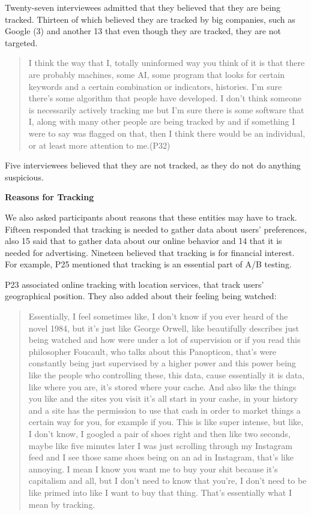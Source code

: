 Twenty-seven interviewees admitted that they believed that they are being
tracked. Thirteen of which believed they are tracked by big companies, such as
Google (3) and another 13 that even though they are tracked, they are not
targeted. 


\begin{quote}I think the way that I, totally uninformed way you think of it is
that there are probably machines, some AI, some program that looks for certain
keywords and a certain combination or indicators, histories. I'm sure there's
some algorithm that people have developed. I don't think someone is
necessarily actively tracking me but I'm sure there is some software that I,
along with many other people are being tracked by and if something I were to
say was flagged on that, then I think there would be an individual, or at
least more attention to me.(P32)\end{quote}


Five interviewees believed that they are not tracked, as they do not do
anything suspicious.


\textbf{Reasons for Tracking}    

We also asked participants about reasons that these entities may have to
track. Fifteen responded that tracking is needed to gather data about users'
preferences, also 15 said that to gather data about our online behavior and 14
that it is needed for advertising. Nineteen believed that tracking is for
financial interest. For example, P25 mentioned that tracking is an essential
part of A/B testing. 

P23 associated online tracking with location services, that track users'
geographical position. They also added about their feeling being watched:

\begin{quote} Essentially, I feel sometimes like, I don't know if you ever
heard of the novel 1984, but it's just like George Orwell, like beautifully
describes just being watched and how were under a lot of supervision or if you
read this philosopher Foucault, who talks about this Panopticon, that's were
constantly being just supervised by a higher power and this power being like
the people who controlling these, this data, cause essentially it is data,
like where you are, it's stored where your cache. And also like the things you
like and the sites you visit it's all start in your cashe, in your history and
a site has the permission to use that cash in order to market things a certain
way for you, for example if you. This is like super intense, but like, I don't
know, I googled a pair of shoes right and then like two seconds, maybe like
five minutes later I was just scrolling through my Instagram feed and I see
those same shoes being on an ad in Instagram, that's like annoying. I mean I
know you want me to buy your shit because it's capitalism and all, but I don't
need to know that you're, I don't need to be like primed into like I want to
buy that thing. That's essentially what I mean by tracking.\end{quote}

